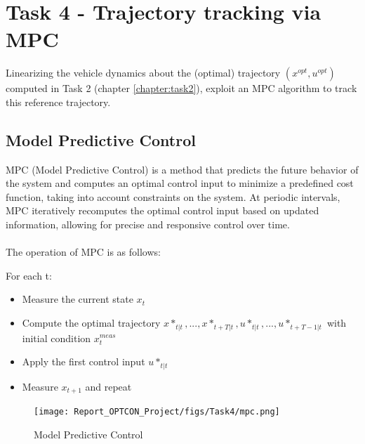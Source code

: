 \documentclass[a4paper,11pt,oneside]{book}
\begin{document}
\chapter{Task 4 - Trajectory tracking via MPC}
Linearizing the vehicle dynamics about the (optimal) trajectory $(x^{opt}, u^{opt})$ computed in Task 2 (chapter \ref{chapter:task2}), exploit an MPC algorithm to track this reference trajectory.

\section{Model Predictive Control}
MPC (Model Predictive Control) is a method that predicts the future behavior of the system and computes an optimal control input to minimize a predefined cost function, taking into account constraints on the system. At periodic intervals, MPC iteratively recomputes the optimal control input based on updated information, allowing for precise and responsive control over time.\\\\
The operation of MPC is as follows:

For each t: 
\begin{itemize}
    \item Measure the current state $x_t$
    \item Compute the optimal trajectory $x*_{t|t}, ..., x*_{t+T|t}, u*_{t|t}, ..., u*_{t+T-1|t}$ with initial condition $x_{t}^{meas}$
    \item Apply the first control input $u*_{t|t}$
    \item Measure $x_{t+1}$ and repeat
\end{itemize}
\begin{figure}[h]
    \centering
    \texttt{[image: Report\_OPTCON\_Project/figs/Task4/mpc.png]} \\
    \caption{Model Predictive Control}
    \label{fig:enter-label}
\end{figure}
\newpage
\end{document}
